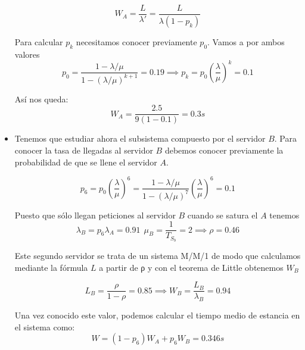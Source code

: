 \begin{problem}[12]
\begin{itemize}
\[W_A = \frac{L}{λ'}=\frac{L}{λ(1-p_k)}\]

Para calcular $p_k$ necesitamos conocer previamente $p_0$. Vamos a por ambos valores
\[p_0 = \frac{1-λ/μ}{1-(λ/μ)^{k+1}}=0.19 \implies p_k = p_0\left( \frac{λ}{μ}\right)^k=0.1\]

Así nos queda:
\[W_A = \frac{2.5}{9(1-0.1)}=0.3s\]

\item

Tenemos que estudiar ahora el subsistema compuesto por el servidor $B$. Para conocer la tasa de llegadas al servidor $B$ debemos conocer previamente la probabilidad de que se llene el servidor $A$.

\[p_6=p_0\left( \frac{λ}{μ}\right)^6=\frac{1-λ/μ}{1-(λ/μ)^{7}}\left( \frac{λ}{μ}\right)^6=0.1\]

Puesto que sólo llegan peticiones al servidor $B$ cuando se satura el $A$ tenemos
\[λ_B = p_6λ_A=0.91 \ \ μ_B=\frac{1}{T_{S_b}}=2 \implies ρ=0.46\]

Este segundo servidor se trata de un sistema M/M/1 de modo que calculamos mediante la fórmula $L$ a partir de ρ y con el teorema de Little obtenemos $W_B$

\[L_B=\frac{ρ}{1-ρ}=0.85 \implies W_B = \frac{L_B}{λ_B}=0.94\]

Una vez conocido este valor, podemos calcular el tiempo medio de estancia en el sistema como:
\[W = (1-p_6)W_A+p_6W_B=0.346s \]

\end{itemize}

\end{problem}

